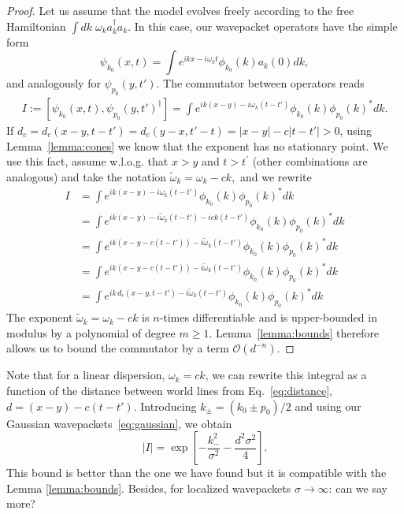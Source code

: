 \documentclass[notitlepage, prx, preprint, amsmath,superscriptaddress,amssymb]{revtex4-1}
\begin{document}
\begin{proof}
Let us assume that the model evolves freely according to the free Hamiltonian
$\int d k \; \omega_k a_k^\dagger a_k$.
In this case, our wavepacket operators have the simple form
\begin{equation}
\psi_{k_0}(x,t) = \int  e^{ikx-i\omega_kt} \phi_{k_0}(k) a_k(0) dk,
\end{equation}
and analogously for $\psi_{p_0}(y,t')$. The commutator between operators reads
\begin{align}
I:=[\psi_{k_0}(x,t),\psi_{p_0}(y,t')^\dagger] =
\int e^{ik(x-y)-i\omega_k(t-t')} \phi_{k_0}(k)\phi_{p_0}(k)^*dk.
\label{eq:free-com}
\end{align}
If $d_c= d_c(x-y,t-t')  = d_c(y-x,t'-t) = |x-y| -c|t-t'|   > 0$, using Lemma\ \ref{lemma:cones} we know that the exponent has no stationary point. We use this fact, assume w.l.o.g.  that $x>y$ and $t>t^\prime$ (other combinations are analogous) and take the notation  $\tilde\omega_k = \omega_k -c k,$ and we rewrite
\begin{align*}
I&= \int  e^{ik(x-y)-i\omega_k(t-t')}  \phi_{k_0}(k)\phi_{p_0}(k)^*dk\\
&= \int  e^{ik(x-y)-i\tilde\omega_k(t-t') - ick(t-t')}  \phi_{k_0}(k)\phi_{p_0}(k)^*dk\\
&= \int  e^{ik(x-y-c(t-t'))-i\tilde\omega_k(t-t')}  \phi_{k_0}(k)\phi_{p_0}(k)^*dk\\
&= \int  e^{ik(x-y-c(t-t'))-i\tilde\omega_k(t-t')}  \phi_{k_0}(k)\phi_{p_0}(k)^*dk\\
&=\int e^{ik\,  d_c(x-y, t-t')-i\tilde\omega_k(t-t')} \phi_{k_0}(k)\phi_{p_0}(k)^*dk
\end{align*}
The exponent $\tilde\omega_k = \omega_k -c k$ is $n$-times differentiable and is upper-bounded in modulus by a polynomial of degree $m\geq 1$. Lemma\ \ref{lemma:bounds} therefore allows us to bound the commutator by a term $\mathcal{O}(d^{-n})$.
\end{proof}

Note that for a linear dispersion, $\omega_k=c k$, we can rewrite this integral as a function of the distance between world lines from Eq.\ \eqref{eq:distance}, $d=(x-y)-c(t-t')$.
Introducing $k_{\pm}=(k_0 \pm p_0)/2$ and using our Gaussian wavepackets\ \eqref{eq:gaussian}, we obtain
\begin{equation}
|I| = \exp\left[-\frac{k_-^2}{\sigma^2}-\frac{d^2\sigma^2}{4}\right].
\label{eq:free-commutator}
\end{equation}
This bound is better than the one we have found but it is compatible with the Lemma \ref{lemma:bounds}.
{\color{red} Besides, for localized wavepackets $\sigma \to \infty$: can we say more?}
\end{document}

